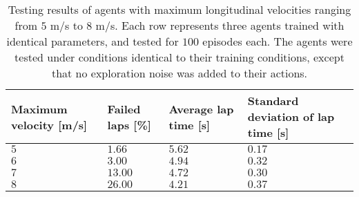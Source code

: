 
\begin{table}[!htb]
\centering
\small
\begin{tabularx}{0.9\textwidth}{RLLL} 
    \hline
    \textbf{Maximum velocity [m/s]} & \textbf{Failed laps [\%]} & \textbf{Average lap time [s]} & \textbf{Standard deviation of lap time [s]}\\ 
    \hline
    $5$ & $1.66$    & $5.62$  & $0.17$ \\
    $6$ & $3.00$    & $4.94$  & $0.32$ \\       
    $7$ & $13.00$   & $4.72$  & $0.30$ \\
    $8$ & $26.00$   & $4.21$  & $0.37$ \\
    \hline
\end{tabularx}
\caption[Testing results of agents with various maximum speeds]{Testing results of agents with maximum longitudinal velocities ranging from $5$ m/s to $8$ m/s. Each row represents three agents trained with identical parameters, and tested for $100$ episodes each. The agents were tested under conditions identical to their training conditions, except that no exploration noise was added to their actions.}
\label{tab:maximum_velocity}
\end{table}
